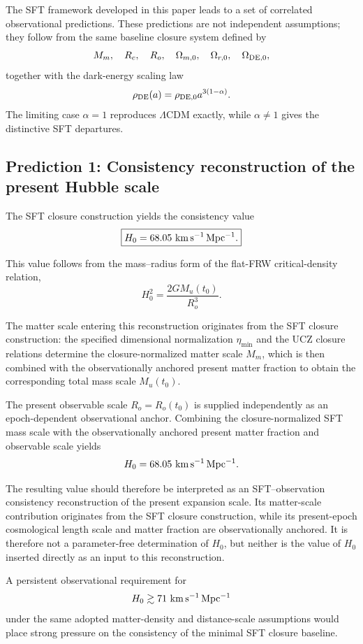 \documentclass[12pt]{article}
\begin{document}
The SFT framework developed in this paper leads to a set of correlated
observational predictions. These predictions are not independent assumptions;
they follow from the same baseline closure system defined by
\[
M_m,\quad R_c,\quad R_o,\quad \Omega_{m,0},\quad \Omega_{r,0},
\quad \Omega_{{\rm DE},0},
\]
together with the dark-energy scaling law
\[
\rho_{\rm DE}(a)=\rho_{{\rm DE},0}a^{3(1-\alpha)}.
\]
The limiting case $\alpha=1$ reproduces $\Lambda$CDM exactly, while
$\alpha\neq1$ gives the distinctive SFT departures.

\subsection{Prediction 1: Consistency reconstruction of the present Hubble scale}

The SFT closure construction yields the consistency value
\[
\boxed{
H_0
=
68.05~{\rm km\,s^{-1}\,Mpc^{-1}}.
}
\]

This value follows from the mass--radius form of the flat-FRW
critical-density relation,
\[
H_0^2
=
\frac{2GM_u(t_0)}{R_o^3}.
\]

The matter scale entering this reconstruction originates from the SFT
closure construction: the specified dimensional normalization
$\eta_{\min}$ and the UCZ closure relations determine the
closure-normalized matter scale $M_m$, which is then combined with the
observationally anchored present matter fraction to obtain the
corresponding total mass scale $M_u(t_0)$.

The present observable scale $R_o=R_o(t_0)$ is supplied independently
as an epoch-dependent observational anchor. Combining the
closure-normalized SFT mass scale with the observationally anchored
present matter fraction and observable scale yields
\[
H_0
=
68.05~{\rm km\,s^{-1}\,Mpc^{-1}}.
\]

The resulting value should therefore be interpreted as an
SFT--observation consistency reconstruction of the present expansion
scale. Its matter-scale contribution originates from the SFT closure
construction, while its present-epoch cosmological length scale and
matter fraction are observationally anchored. It is therefore not a
parameter-free determination of $H_0$, but neither is the value of
$H_0$ inserted directly as an input to this reconstruction.

A persistent observational requirement for
\[
H_0 \gtrsim 71~{\rm km\,s^{-1}\,Mpc^{-1}}
\]
under the same adopted matter-density and distance-scale assumptions
would place strong pressure on the consistency of the minimal SFT
closure baseline.
\end{document}
